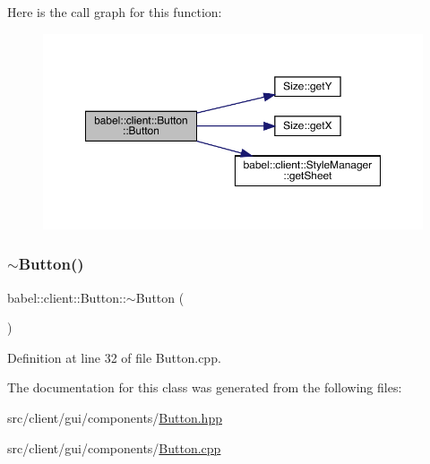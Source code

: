 Here is the call graph for this function\+:\nopagebreak
\begin{figure}[H]
\begin{center}
\leavevmode
\includegraphics[width=350pt]{classbabel_1_1client_1_1_button_ab16b9acecd816d2b510cda7df78a1b12_cgraph}
\end{center}
\end{figure}
\mbox{\label{classbabel_1_1client_1_1_button_a2d571e0f4bd0ca7ab21ea1cf304d6335}} 
\subsubsection{\texorpdfstring{$\sim$\+Button()}{~Button()}}
{\footnotesize\ttfamily babel\+::client\+::\+Button\+::$\sim$\+Button (\begin{DoxyParamCaption}{ }\end{DoxyParamCaption})}



Definition at line 32 of file Button.\+cpp.



The documentation for this class was generated from the following files\+:\begin{DoxyCompactItemize}
\item 
src/client/gui/components/\mbox{\hyperlink{_button_8hpp}{Button.\+hpp}}\item 
src/client/gui/components/\mbox{\hyperlink{_button_8cpp}{Button.\+cpp}}\end{DoxyCompactItemize}

